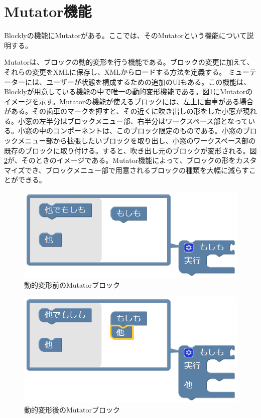 \documentclass{risepaper}
\begin{document}
   \section{Mutator機能}
   
Blocklyの機能にMutatorがある。ここでは、そのMutatorという機能について説明する。

Mutatorは、ブロックの動的変形を行う機能である。ブロックの変更に加えて、それらの変更をXMLに保存し、XMLからロードする方法を定義する。 ミューテーターには、ユーザーが状態を構成するための追加のUIもある。この機能は、Blocklyが用意している機能の中で唯一の動的変形機能である。図\ref{fig:mutator1}にMutatorのイメージを示す。Mutatorの機能が使えるブロックには、左上に歯車がある場合がある。その歯車のマークを押すと、その近くに吹き出しの形をした小窓が現れる。小窓の左半分はブロックメニュー部、右半分はワークスペース部となっている。小窓の中のコンポーネントは、このブロック限定のものである。小窓のブロックメニュー部から拡張したいブロックを取り出し、小窓のワークスペース部の既存のブロックに取り付ける。すると、吹き出し元のブロックが変形される。図\ref{fig:mutator2}が、そのときのイメージである。Mutator機能によって、ブロックの形をカスタマイズでき、ブロックメニュー部で用意されるブロックの種類を大幅に減らすことができる。

\begin{figure}[h]
\begin{center}
\includegraphics[scale=0.5]{img/mutator1.eps}
\caption{動的変形前のMutatorブロック}%
\label{fig:mutator1}
\end{center}%
\end{figure}%

\begin{figure}[h]
\begin{center}
\includegraphics[scale=0.5]{img/mutator2.eps}
\caption{動的変形後のMutatorブロック}%
\label{fig:mutator2}
\end{center}%
\end{figure}%
\end{document}
